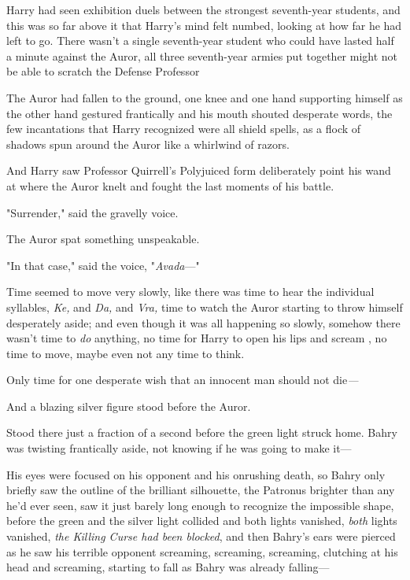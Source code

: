 Harry had seen exhibition duels between the strongest seventh-year students,
and this was so far above it that Harry's mind felt numbed, looking at how far
he had left to go. There wasn't a single seventh-year student who could have
lasted half a minute against the Auror, all three seventh-year armies put
together might not be able to scratch the Defense Professor{\el}

The Auror had fallen to the ground, one knee and one hand supporting himself as
the other hand gestured frantically and his mouth shouted desperate words, the
few incantations that Harry recognized were all shield spells, as a flock of
shadows spun around the Auror like a whirlwind of razors.

And Harry saw Professor Quirrell's Polyjuiced form deliberately point his wand
at where the Auror knelt and fought the last moments of his battle.

"Surrender," said the gravelly voice.

The Auror spat something unspeakable.

"In that case," said the voice, "\emph{Avada}\mbox{---}"

Time seemed to move very slowly, like there was time to hear the individual
syllables, \emph{Ke,} and \emph{Da,} and \emph{Vra,} time to watch the Auror
starting to throw himself desperately aside; and even though it was all
happening so slowly, somehow there wasn't time to \emph{do} anything, no time
for Harry to open his lips and scream \emph{}, no time to move, maybe even
not any time to think.

Only time for one desperate wish that an innocent man should not die\emph{---}

And a blazing silver figure stood before the Auror.

Stood there just a fraction of a second before the green light struck home.
\sbreak
Bahry was twisting frantically aside, not knowing if he was going to make it---

His eyes were focused on his opponent and his onrushing death, so Bahry only
briefly saw the outline of the brilliant silhouette, the Patronus brighter than
any he'd ever seen, saw it just barely long enough to recognize the impossible
shape, before the green and the silver light collided and both lights vanished,
\emph{both} lights vanished, \emph{the Killing Curse had been blocked}, and
then Bahry's ears were pierced as he saw his terrible opponent screaming,
screaming, screaming, clutching at his head and screaming, starting to fall as
Bahry was already falling---

